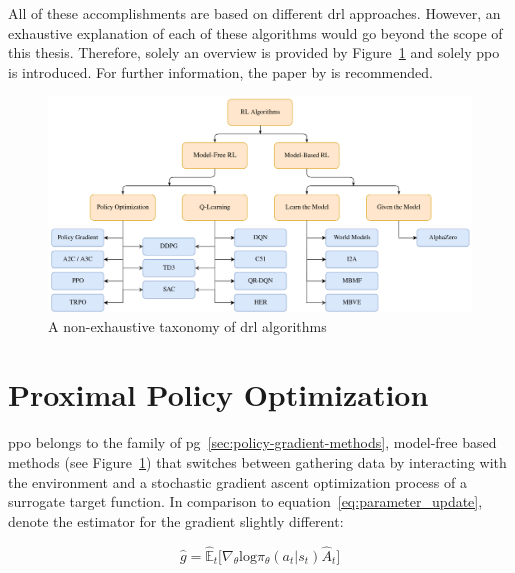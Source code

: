 \documentclass[draft,final]{vutinfth} %
\begin{document}
    All of these accomplishments are based on different \gls{drl} approaches.
    However, an exhaustive explanation of each of these algorithms would go beyond the scope of this thesis.
    Therefore, solely an overview is provided by Figure~\ref{fig:drl_taxonomy} and solely \gls{ppo} is introduced.
    For further information, the paper by \citeauthor{francois-lavet_introduction_2018} is recommended.

    \begin{figure}[h]
        \centering
        \includegraphics[width=\textwidth]{figures/drl_taxonomy.png}
        \caption[A non-exhaustive taxonomy of \gls{drl} algorithms]{A non-exhaustive taxonomy of \gls{drl} algorithms\protect\footnotemark}
        \label{fig:drl_taxonomy}
    \end{figure}



    \section{Proximal Policy Optimization}\label{sec:proximal-policy-optimization}
    \gls{ppo} belongs to the family of \gls{pg}~\eqref{sec:policy-gradient-methods}, model-free based methods (see Figure~\ref{fig:drl_taxonomy}) that switches between gathering data by interacting with the environment and a stochastic gradient ascent optimization process of a surrogate target function.
    In comparison to equation~\ref{eq:parameter_update}, \citet{schulman_proximal_2017} denote the estimator for the gradient slightly different:

    \begin{equation}
        \hat{g}=\hat{\mathbb{E}}_t \bigg [\nabla_\theta \text{log}\pi_\theta(a_t|s_t)\hat{A}_t\bigg]\label{eq:policy_gradient_method_maximization}
    \end{equation}
\end{document}
